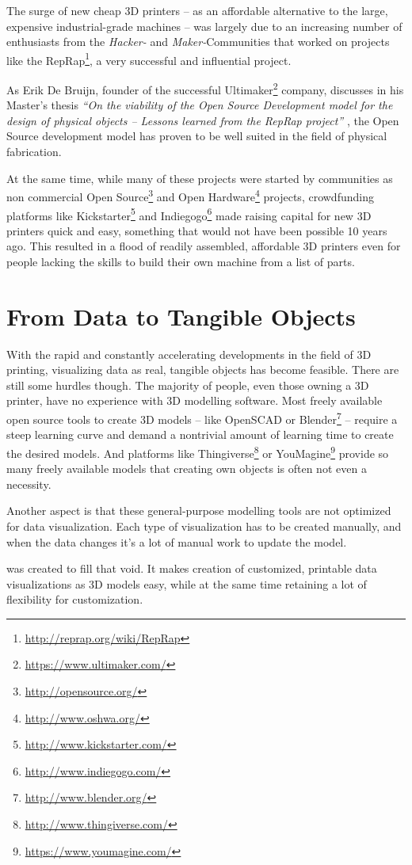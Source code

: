 
The surge of new cheap 3D printers -- as an affordable alternative to the large,
expensive industrial-grade machines -- was largely due to an increasing number
of enthusiasts from the \emph{Hacker-} and \emph{Maker-}Communities that worked
on projects like the RepRap\footnote{\url{http://reprap.org/wiki/RepRap}}, a
very successful and influential project.

As Erik De Bruijn, founder of the successful
Ultimaker\footnote{\url{https://www.ultimaker.com/}} company, discusses in his
Master's thesis \textit{``On the viability of the Open Source Development model
for the design of physical objects -- Lessons learned from the RepRap project''}
\cite{bruijn:2010}, the Open Source development model has proven to be well
suited in the field of physical fabrication.

At the same time, while many of these projects were started by communities as
non commercial Open Source\footnote{\url{http://opensource.org/}} and Open
Hardware\footnote{\url{http://www.oshwa.org/}} projects, crowdfunding platforms
like Kickstarter\footnote{\url{http://www.kickstarter.com/}} and
Indiegogo\footnote{\url{http://www.indiegogo.com/}} made raising capital for new
3D printers quick and easy, something that would not have been possible 10 years
ago. This resulted in a flood of readily assembled, affordable 3D printers even
for people lacking the skills to build their own machine from a list of parts.


\section{From Data to Tangible Objects}

With the rapid and constantly accelerating developments in the field of 3D
printing, visualizing data as real, tangible objects has become feasible. There
are still some hurdles though.  The majority of people, even those owning a 3D
printer, have no experience with 3D modelling software. Most freely available
open source tools to create 3D models -- like OpenSCAD or
Blender\footnote{\url{http://www.blender.org/}} -- require a steep learning
curve and demand a nontrivial amount of learning time to create the desired
models. And platforms like
Thingiverse\footnote{\url{http://www.thingiverse.com/}} or
YouMagine\footnote{\url{https://www.youmagine.com/}} provide so many freely
available models that creating own objects is often not even a necessity.

Another aspect is that these general-purpose modelling tools are not optimized
for data visualization. Each type of visualization has to be created manually,
and when the data changes it's a lot of manual work to update the model.

\tangible{} was created to fill that void. It makes creation of customized,
printable data visualizations as 3D models easy, while at the same time
retaining a lot of flexibility for customization.
